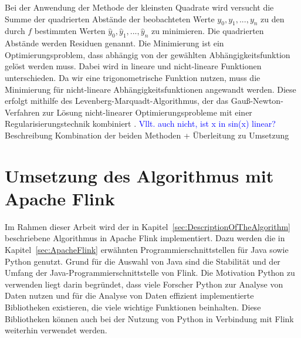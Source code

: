Bei der Anwendung der Methode der kleinsten Quadrate wird versucht die Summe der quadrierten Abstände der beobachteten Werte \(y_0, y_1,...,y_n\) zu den durch \(f\) bestimmten Werten \(\hat{y}_0, \hat{y}_1,...,\hat{y}_n\) zu minimieren. Die quadrierten Abstände werden Residuen genannt. Die Minimierung ist ein Optimierungsproblem, dass abhängig von der gewählten Abhängigkeitsfunktion gelöst werden muss. Dabei wird in lineare und nicht-lineare Funktionen unterschieden. Da wir eine trigonometrische Funktion nutzen, muss die Minimierung für nicht-lineare Abhängigkeitsfunktionen angewandt werden. Diese erfolgt mithilfe des Levenberg-Marquadt-Algorithmus, der das Gauß-Newton-Verfahren zur Lösung nicht-linearer Optimierungsprobleme mit einer Regularisierungstechnik kombiniert \cite{Levenberg1978}. \textcolor{blue}{Vllt. auch nicht, ist x in sin(x) linear?} \\

Beschreibung Kombination der beiden Methoden + Überleitung zu Umsetzung


\section{Umsetzung des Algorithmus mit Apache Flink}
\label{sec:ImplementationFlinkDescription}
Im Rahmen dieser Arbeit wird der in Kapitel~\ref{sec:DescriptionOfTheAlgorithm} beschriebene Algorithmus in Apache Flink implementiert. Dazu werden die in Kapitel~\ref{sec:ApacheFlink} erwähnten Programmierschnittstellen für Java sowie Python genutzt. Grund für die Auswahl von Java sind die Stabilität und der Umfang der Java-Programmierschnittstelle von Flink. Die Motivation Python zu verwenden liegt darin begründet, dass viele Forscher Python zur Analyse von Daten nutzen und für die Analyse von Daten effizient implementierte Bibliotheken existieren, die viele wichtige Funktionen beinhalten. Diese Bibliotheken können auch bei der Nutzung von Python in Verbindung mit Flink weiterhin verwendet werden. 

